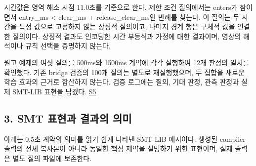 \documentclass[11pt,a4paper]{article}
\begin{document}
시간값은 영역 해소 시점 11.0초를 기준으로 한다. 제한 조건 질의에서는 {\ttfamily\small enters}가 참이면서 {\ttfamily\small entry\_\allowbreak{}ms < clear\_\allowbreak{}ms + release\_\allowbreak{}clear\_\allowbreak{}ms}인 반례를 찾는다. 이 질의는 두 시간을 특정 값으로 고정하지 않는 상징적 질의이고, 나머지 경계 행은 구체적 값을 연결한 질의이다. 상징적 결과도 인코딩한 시간 부등식과 가정에 대한 결과이며, 영상의 해석이나 규칙 선택을 증명하지 않는다.\par

원고 예제의 여섯 질의를 500ms와 1500ms 계약에 각각 실행하여 12개 판정의 일치를 확인했다. 기존 bridge 검증의 100개 질의는 별도로 재실행했으며, 두 집합을 새로운 학습 효과의 근거로 합산하지 않는다. 검증 로그에는 질의, 기대 판정, 관측 판정과 실제 SMT-LIB 표현을 남겼다. \href{\detokenize{manuscript_examples.json}}{S5}\par

\subsection*{3. SMT 표현과 결과의 의미}

아래는 0.5초 계약의 의미를 읽기 쉽게 나타낸 SMT-LIB 예시이다. 생성된 compiler 출력의 전체 복사본이 아니라 동일한 핵심 제약을 설명하기 위한 표현이며, 실제 출력은 별도 질의 파일에 보존한다.\par
\end{document}
